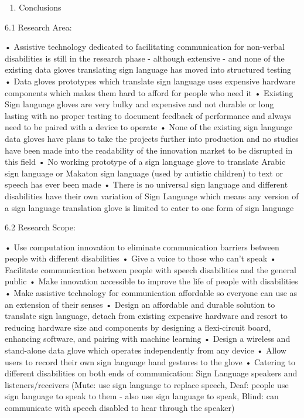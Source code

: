 
1.	Conclusions

6.1 Research Area: 

•	Assistive technology dedicated to facilitating communication for non-verbal disabilities is still in the research phase - although extensive - and none of the existing data gloves translating sign language has moved into structured testing 
•	Data gloves prototypes which translate sign language uses expensive hardware components which makes them hard to afford for people who need it 
•	Existing Sign language gloves are very bulky and expensive and not durable or long lasting with no proper testing to document feedback of performance and always need to be paired with a device to operate 
•	None of the existing sign language data gloves have plans to take the projects further into production and no studies have been made into the readability of the innovation market to be disrupted in this field 
•	No working prototype of a sign language glove to translate Arabic sign language or Makaton sign language (used by autistic children) to text or speech has ever been made
•	There is no universal sign language and different disabilities have their own variation of Sign Language which means any version of a sign language translation glove is limited to cater to one form of sign language 

6.2 Research Scope:

•	Use computation innovation to eliminate communication barriers between people with different disabilities
•	Give a voice to those who can’t speak
•	Facilitate communication between people with speech disabilities and the general public
•	Make innovation accessible to improve the life of people with disabilities 
•	Make assistive technology for communication affordable so everyone can use as an extension of their senses 
•	Design an affordable and durable solution to translate sign language, detach from existing expensive hardware and resort to reducing hardware size and components by designing a flexi-circuit board, enhancing software, and pairing with machine learning
•	Design a wireless and stand-alone data glove which operates independently from any device
•	Allow users to record their own sign language hand gestures to the glove  
•	Catering to different disabilities on both ends of communication: Sign Language speakers and listeners/receivers (Mute: use sign language to replace speech, Deaf: people use sign language to speak to them - also use sign language to speak, Blind: can communicate with speech disabled to hear through the speaker)

